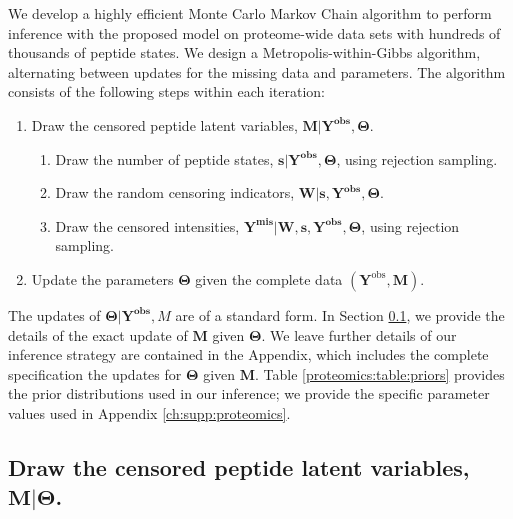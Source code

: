 We develop a highly efficient Monte Carlo Markov Chain algorithm to perform inference with the proposed model on proteome-wide data sets with hundreds of thousands of peptide states.
We design a Metropolis-within-Gibbs algorithm, alternating between updates for the missing data and parameters.
The algorithm consists of the following steps within each iteration:
%
\begin{enumerate}
\item Draw the censored peptide latent variables, $\mathbf{M}\vert\mathbf{Y^{obs}}, \bm \Theta$.

\begin{enumerate}
\item Draw the number of peptide states, $\bm s \vert \mathbf{Y^{obs}}, \bm \Theta$, using rejection sampling.
\item Draw the random censoring indicators, $\bm{W} \vert \bm s,  \mathbf{Y^{obs}}, \bm \Theta$.
\item Draw the censored intensities, $\mathbf{Y^{mis}} \vert \bm{W},\bm{s}, \bm{Y^{obs}}, \bm{\Theta}$, using rejection sampling.
\end{enumerate}
\item Update the parameters $\bm \Theta$ given the complete data $(\bm Y^\mathrm{obs}, \bm M)$.
\end{enumerate}
%
The updates of $\bm{\Theta} | \bm{Y^{obs}}, M$ are of a standard form.
In Section \ref{proteomics:sec:missingDataDraw}, we provide the details of the exact update of $\bm M$ given $\bm \Theta$.
We leave further details of our inference strategy are contained in the Appendix, which includes the complete specification the updates for $\bm \Theta$ given $\bm M$.
Table \ref{proteomics:table:priors} provides the prior distributions used in our inference; we provide the specific parameter values used in Appendix \ref{ch:supp:proteomics}.


\subsection{Draw the censored peptide latent variables, $\mathbf{M} \vert \bm \Theta$.}
\label{proteomics:sec:missingDataDraw}

